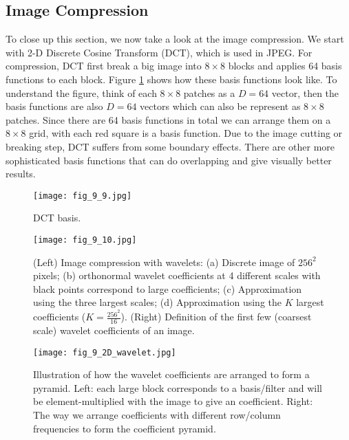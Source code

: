 \documentclass[../main.tex]{subfiles}
\begin{document}
\subsection{Image Compression}
To close up this section, we now take a look at the image compression. We start with 2-D Discrete Cosine Transform (DCT), which is used in JPEG. For compression, DCT first break a big image into $8\times 8$ blocks and applies 64 basis functions to each block. Figure \ref{fig_9_9} shows how these basis functions look like. To understand the figure, think of each $8\times 8$ patches as a $D=64$ vector, then the basis functions are also $D=64$ vectors which can also be represent as $8\times 8$ patches. Since there are 64 basis functions in total we can arrange them on a $8\times 8$ grid, with each red square is a basis function. Due to the image cutting or breaking step, DCT suffers from some boundary effects. There are other more sophisticated basis functions that can do overlapping and give visually better results.
\begin{figure}[h] 
	\centering 
	\texttt{[image: fig\_9\_9.jpg]} 
	\caption{DCT basis.}\label{fig_9_9}
\end{figure}
\begin{figure}[h] 
	\centering 
	\texttt{[image: fig\_9\_10.jpg]} 
	\caption{(Left) Image compression with wavelets: (a) Discrete image of $256^2$ pixels; (b) orthonormal wavelet coefficients at 4 different scales with black points correspond to large coefficients; (c) Approximation using the three largest scales; (d) Approximation using the $K$ largest coefficients ($K=\frac{256^2}{16}$). (Right) Definition of the first few (coarsest scale) wavelet coefficients of an image.}\label{fig_9_10}
\end{figure}
\begin{figure}[h] 
	\centering 
	\texttt{[image: fig\_9\_2D\_wavelet.jpg]} 
	\caption{Illustration of how the wavelet coefficients are arranged to form a pyramid. Left: each large block corresponds to a basis/filter and will be element-multiplied with the image to give an coefficient. Right: The way we arrange coefficients with different row/column frequencies to form the coefficient pyramid.}\label{fig_9_2D_wavelet}
\end{figure}
\end{document}
